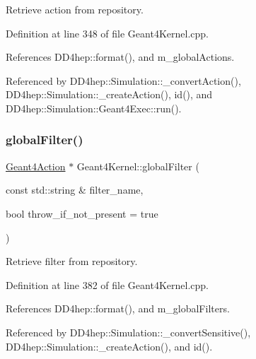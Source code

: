 Retrieve action from repository. 



Definition at line 348 of file Geant4\+Kernel.\+cpp.



References D\+D4hep\+::format(), and m\+\_\+global\+Actions.



Referenced by D\+D4hep\+::\+Simulation\+::\+\_\+convert\+Action(), D\+D4hep\+::\+Simulation\+::\+\_\+create\+Action(), id(), and D\+D4hep\+::\+Simulation\+::\+Geant4\+Exec\+::run().

\hypertarget{class_d_d4hep_1_1_simulation_1_1_geant4_kernel_ad6b6f410f168992639e4fe3fa9fc2c73}{}\label{class_d_d4hep_1_1_simulation_1_1_geant4_kernel_ad6b6f410f168992639e4fe3fa9fc2c73} 
\subsubsection{\texorpdfstring{global\+Filter()}{globalFilter()}}
{\footnotesize\ttfamily \hyperlink{class_d_d4hep_1_1_simulation_1_1_geant4_action}{Geant4\+Action} $\ast$ Geant4\+Kernel\+::global\+Filter (\begin{DoxyParamCaption}\item[{const std\+::string \&}]{filter\+\_\+name,  }\item[{bool}]{throw\+\_\+if\+\_\+not\+\_\+present = {\ttfamily true} }\end{DoxyParamCaption})}



Retrieve filter from repository. 



Definition at line 382 of file Geant4\+Kernel.\+cpp.



References D\+D4hep\+::format(), and m\+\_\+global\+Filters.



Referenced by D\+D4hep\+::\+Simulation\+::\+\_\+convert\+Sensitive(), D\+D4hep\+::\+Simulation\+::\+\_\+create\+Action(), and id().

\hypertarget{class_d_d4hep_1_1_simulation_1_1_geant4_kernel_af867ef6ab82942e84625c5ebb9a06c3c}{}\label{class_d_d4hep_1_1_simulation_1_1_geant4_kernel_af867ef6ab82942e84625c5ebb9a06c3c} 
